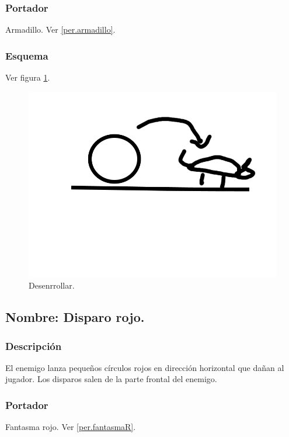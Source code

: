 \documentclass[11pt,letterpaper]{article}
\begin{document}
		\subsubsection{Portador}
		Armadillo. Ver \ref{per.armadillo}.
		\subsubsection{Esquema}
		Ver figura \ref{fig:desenrrollar}.
		\begin{figure}
			\centering
			\includegraphics[height=0.2 \textheight]{Imagenes/desenrrollar}
			\caption{Desenrrollar.}
			\label{fig:desenrrollar}
		\end{figure}
	\subsection{Nombre: Disparo rojo.} \label{hab.disparoR}
		\subsubsection{Descripción}
		El enemigo lanza pequeños círculos rojos en dirección horizontal que dañan al jugador. Los disparos salen de la parte frontal del enemigo.
		\subsubsection{Portador}
		Fantasma rojo. Ver \ref{per.fantasmaR}.
\end{document}
